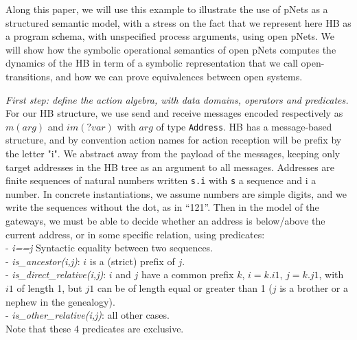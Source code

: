 \documentclass{lncs/llncs}
\begin{document}
Along this paper, we will use this example to illustrate the use of
pNets as a structured semantic model, with a stress on the fact that
we represent here HB as a program schema, with unspecified process
arguments, using open pNets. We will show how the symbolic operational
semantics of open pNets computes the dynamics of the HB in term of a
symbolic representation that we call open-transitions, and how we can
prove equivalences between open systems.

\begin{example} \emph{First step: define the action algebra, with data domains,
    operators and predicates.}
  For our HB structure, we use send and receive messages encoded
  respectively as $m(arg)$ and $im(?var)$ with
  $arg$ of type \texttt{Address}. HB has a message-based
  structure, and by convention action names for action reception will
  be prefix by the letter "i". We abstract away
  from the payload of the messages, keeping only target addresses in the HB
  tree as an argument to all messages. Addresses are finite sequences
  of natural numbers written \texttt{s.i}
  with \texttt{s} a sequence and i a number. In concrete instantiations, we
  assume numbers are simple digits, and we write the sequences without
  the dot, as in ``121''. Then in the model of the
  gateways, we must be able to decide whether an address is below/above the
  current address, or in some specific relation, using
  predicates:\\
  - \emph{i==j} Syntactic equality between two sequences.\\
  - \emph{is\_ancestor(i,j)}: $i$ is a (strict) prefix of $j$.\\
  - \emph{is\_direct\_relative(i,j)}: $i$ and $j$ have a common prefix $k$, $i=k.i1$, $j=k.j1$, with $i1$ of length 1, but $j1$ can be of length equal or greater than 1 ($j$ is a brother or a nephew in the genealogy).\\
  - \emph{is\_other\_relative(i,j)}: all other cases.\\
  Note that these 4 predicates are exclusive.
\end{example}
\end{document}

